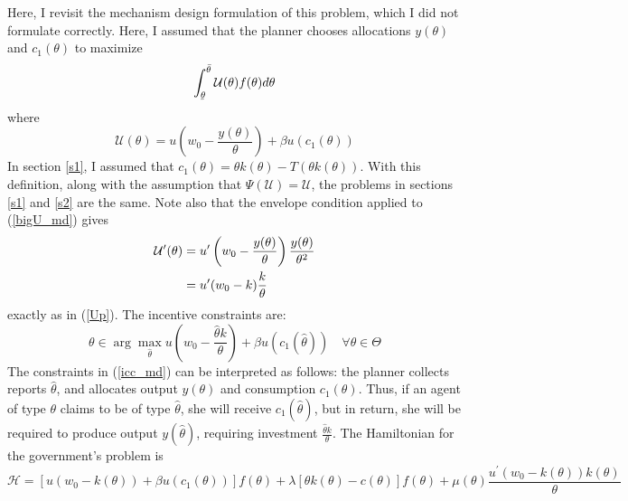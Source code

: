 \documentclass[11pt]{article}
\newcommand{\ubar}[1]{\underaccent{\bar}{#1}}
\newcommand{\p}{\prime}
\newcommand{\U}{\mathcal{U}}
\begin{document}
Here, I revisit the mechanism design formulation of this problem, which I did not formulate correctly. Here, I assumed that the planner chooses allocations \( y(\theta) \) and \( c_1(\theta) \) to maximize 
\begin{equation}
    \int_{\ubar{\theta}}^{\bar{\theta}} \U(\theta)f(\theta)d\theta \label{gov_obj_md}
\end{equation}
where 
\begin{equation}
    \U(\theta) = u\left( w_0 - \frac{y(\theta)}{\theta} \right) + \beta u(c_1(\theta)) \label{bigU_md}
\end{equation}
In section \ref{s1}, I assumed that \( c_1(\theta) = \theta k(\theta) - T(\theta k(\theta)) \). With this definition, along with the assumption that \( \Psi(\U) = \U \), the problems in sections \ref{s1} and \ref{s2} are the same. Note also that the envelope condition applied to (\ref{bigU_md}) gives 
\begin{align}
    \U^\p(\theta) &= u^\p\left( w_0 - \frac{y(\theta)}{\theta} \right)\frac{y(\theta)}{\theta^2} \notag \\
    &= u^\p(w_0 - k)\frac{k}{\theta} 
\end{align}
exactly as in (\ref{Up}). The incentive constraints are: 
\begin{equation}
    \theta \in \arg\max_{\hat{\theta}} u\left( w_0 - \frac{\hat{\theta} k}{\theta} \right) + \beta u(c_1(\hat{\theta}))\quad \forall \theta\in\Theta \label{icc_md}
\end{equation}
The constraints in (\ref{icc_md}) can be interpreted as follows: the planner collects reports \( \hat{\theta} \), and allocates output \( y(\theta) \) and consumption \( c_1(\theta) \). Thus, if an agent of type \( \theta \) claims to be of type \( \hat{\theta} \), she will receive \( c_1(\hat{\theta}) \), but in return, she will be required to produce output \( y(\hat{\theta}) \), requiring investment \( \frac{\hat{\theta}k}{\theta} \). The Hamiltonian for the government's problem is 
\begin{equation}
    \mathcal{H} = \left[ u(w_0 - k(\theta)) + \beta u(c_1(\theta)) \right]f(\theta) + \lambda\left[ \theta k(\theta) - c(\theta) \right]f(\theta) + \mu(\theta)\frac{u^\p(w_0 - k(\theta))k(\theta)}{\theta}
\end{equation}



\end{document}
